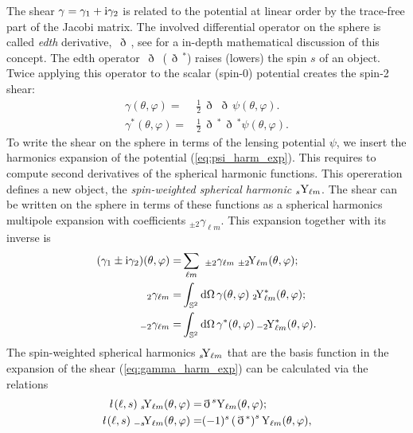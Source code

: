 \documentclass[fleqn,usenatbib]{mnras} %
\newcommand{\ellbar}{\hbox{\it \l}\,}
\newcommand{\edth}{\,\eth\,}
\begin{document}
The shear $\gamma = \gamma_1 + {\rm i} \gamma_2$ is related to the potential at
linear order by the trace-free part of the Jacobi matrix. The involved
differential operator on the sphere is called \emph{edth} derivative, $\edth$,
see \cite{2005PhRvD..72b3516C} for a in-depth mathematical discussion of this
concept. The edth operator $\edth$ ($\edth^\ast$) raises (lowers) the spin $s$
of an object. Twice applying this operator to the scalar (spin-0) potential
creates the spin-2 shear:
%
\begin{align}
  \gamma(\theta, \varphi) = & \frac 1 2 \edth \edth \psi(\theta, \varphi).
    \nonumber \\
  \gamma^\ast(\theta, \varphi) = & \frac 1 2 \edth^\ast \edth^\ast \psi(\theta, \varphi).
  \label{gamma_psi_spher}
\end{align}
%
To write the shear on the sphere in terms of the lensing potential $\psi$, we
insert the harmonics expansion of the potential (\ref{eq:psi_harm_exp}). This
requires to compute second derivatives of the spherical harmonic functions.
This opereration defines a new object, the \emph{spin-weighted spherical
harmonic} $_s{\rm Y}_{\ell m}$. The shear can be written on the sphere in terms
of these functions as a spherical harmonics multipole expansion with
coefficients $_{\pm 2} \gamma_{\ell m}$. This expansion together with its inverse
is
%
%
\begin{align}
  (\gamma_1 \pm {\rm i} \gamma_2)(\theta, \varphi) = & \sum_{\ell m} \,\, _{\pm 2}\gamma_{\ell m} \; _{\pm 2}\!{\rm Y}_{\ell m}(\theta, \varphi);
  \label{eq:gamma_harm_exp}
    \\
  \, _2 \gamma_{\ell m} = & \int_{\mathbb{S}^2} {\rm d} \Omega \, \gamma(\theta, \varphi) \;  _2\!{\rm Y}^\ast_{\ell m}(\theta, \varphi);
    \nonumber \\
  \, _{-2} \gamma_{\ell m} = & \int_{\mathbb{S}^2} {\rm d} \Omega \, \gamma^\ast(\theta, \varphi) \,  _{-2}\!{\rm Y}^\ast_{\ell m}(\theta, \varphi).
  \label{eq:gamma_harm_exp_inv}
\end{align}
%
The spin-weighted spherical harmonics $_s\!{\rm Y}_{\ell m}$ that are the basis function
in the expansion of the shear (\ref{eq:gamma_harm_exp}) can be calculated via the relations
%
%
\begin{align}
  \ellbar(\ell, s) \; _s\!{\rm Y}_{\ell m}(\theta, \varphi) = & \edth^s {\rm Y}_{\ell m}(\theta, \varphi);
    \nonumber \\
  \ellbar(\ell, s) \; _{-s}\!{\rm Y}_{\ell m}(\theta, \varphi) = & (-1)^s \left(\edth^\ast\right)^s {\rm Y}_{\ell m}(\theta, \varphi),
  \label{eq:sYlm_def} 
\end{align}
\end{document}

